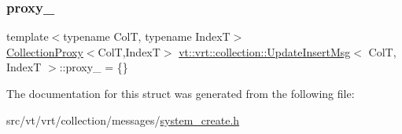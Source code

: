 \mbox{\label{structvt_1_1vrt_1_1collection_1_1_update_insert_msg_ae24b0b8a8147f78cb6275b97ddb3d6a0}} 
\subsubsection{\texorpdfstring{proxy\+\_\+}{proxy\_}}
{\footnotesize\ttfamily template$<$typename ColT, typename IndexT$>$ \\
\hyperlink{structvt_1_1vrt_1_1collection_1_1_collection_proxy}{Collection\+Proxy}$<$ColT,IndexT$>$ \hyperlink{structvt_1_1vrt_1_1collection_1_1_update_insert_msg}{vt\+::vrt\+::collection\+::\+Update\+Insert\+Msg}$<$ ColT, IndexT $>$\+::proxy\+\_\+ = \{\}}



The documentation for this struct was generated from the following file\+:\begin{DoxyCompactItemize}
\item 
src/vt/vrt/collection/messages/\hyperlink{system__create_8h}{system\+\_\+create.\+h}\end{DoxyCompactItemize}
